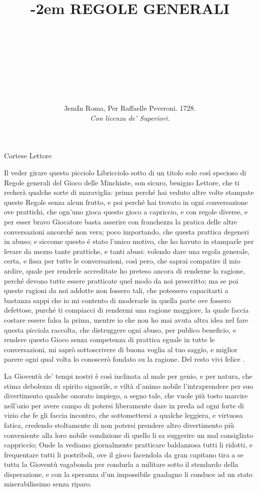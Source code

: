 \documentclass[12pt,a6paper]{article}
\title{\kern -2em
{\huge REGOLE GENERALI}\\
\textls[120]{\Large Del Nobilissimo Gioco}\\
\textls[1000]{\normalsize DELLE}\\
\fontsize{34}{34}\selectfont{\textls[100]{MINCHIATE}}}
\author{%
  \vspace{-26pt}\\
\textls[122]{Con un modo breve, e facile}\\
\textls[44]{per ben imparare a giocarlo.}\\}
\date{%
\vfill
  \kern 3em\small In Roma, Per Raffaelle Peveroni. 1728.\\ \sepline
  \textit{Con licenza de’ Superiori.}}
\begin{document}

\maketitle
 

 


 

 

 
Cortese Lettore

Il veder girare questo
picciolo Libricciolo sotto di un
titolo solo così specioso di
Regole generali del Gioco
delle Minchiate, son sicuro,
benigno Lettore, che ti recherà
qualche sorte di maraviglia:
prima perché hai veduto altre
volte stampate queste Regole
senza alcun frutto, e poi perché
hai trovato in ogni conversazione
ove prattichi, che ogn'uno
gioca questo gioco a capriccio,
e con regole diverse, e per
esser bravo Giocatore basta
asserire con franchezza la
pratica delle altre conversazioni
ancorché non vera; poco importando,
che questa prattica degeneri
in abuso; e siccome questo
é stato l'unico motivo, che ho
havuto in stamparle per levare
da mezzo tante prattiche, e
tanti abusi: volendo dare una
regola generale, certa, e fissa
per tutte le conversazioni, così
pero, che saprai compatire il
mio ardire, quale per renderle
accreditate ho preteso ancora
di renderne la ragione, perché
devono tutte essere pratticate
quel modo da noi prescritto; ma
se poi queste ragioni da noi
addotte non fossero tali, che
potessero capacitarti a bastanza
sappi che io mi contento
di moderarle in quella parte 
ove fossero defettose, purché ti
compiacci di rendermi una ragione
maggiore, la quale faccia
costare essere falsa la prima,
mentre io che non ho mai avuta
altra idea nel fare questa
picciola raccolta, che distruggere
ogni abuso, per publico beneficio,
e rendere questo Gioco senza
competenza di prattica eguale
in tutte le conversazioni, mi
saprò sottoscrivere di buona
voglia al tuo saggio, e miglior
parere ogni qual volta lo
conoscerò fondato su la ragione. Del
resto vivi felice .

La Gioventù de' tempi
nostri è così inclinata
al male per genio, e
per natura, che stima
debolezza di spirito signorile,
e viltà d’animo nobile
l'intraprendere per suo divertimento
qualche onorato impiego, a segno
tale, che vuole più tosto
marcire nell'ozio per avere
campo di potersi liberamente
dare in preda ad ogni forte di
vizio che fe gli faccia incontro,
che sottomettersi a qualche leggiera,
e virtuosa fatica, credendo
stoltamente di non potersi
prendere altro divertimento
più conveniente alla loro nobile
condizione di quello li sa suggerire
un mal consigliato cappriccio;
Onde la vediamo giornalmente
pratticare baldanzosa
tutti li ridotti, e frequentare
tutti li postriboli, ove il gioco
facendola da gran capitano tira
a se tutta la Gioventù vagabonda
per condurla a militare sotto
il stendardo della disperazione,
e con la speranza d’un impossibile
guadagno li conduce ad un
stato miserabilissimo senza riparo.
\end{document}
